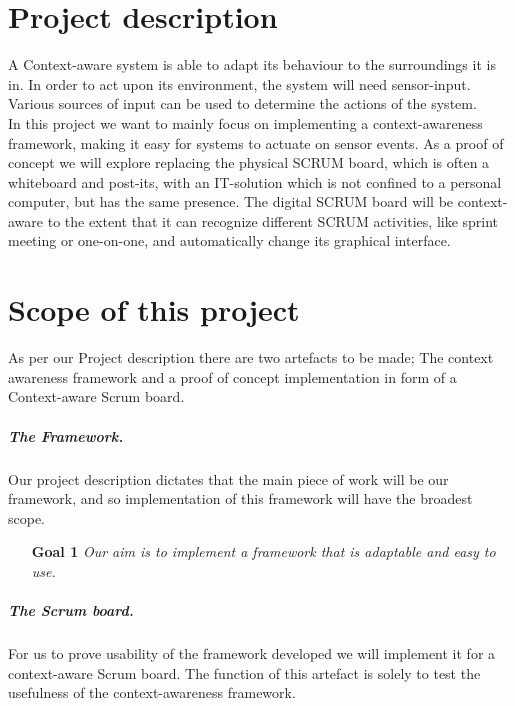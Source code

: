 \documentclass[]{report}
\begin{document}
\graphicspath{{img/}{../img/}}


\begin{abstract}
\end{abstract}


\chapter{Project description}
A Context-aware system is able to adapt its behaviour to the surroundings it is in. In order to act upon its environment, the system will need sensor-input. Various sources of input can be used to determine the actions of the system.\\

In this project we want to mainly focus on implementing a context-awareness framework, making it easy for systems to actuate on sensor events. As a proof of concept we will explore replacing the physical SCRUM board, which is often a whiteboard and post-its, with an IT-solution which is not confined to a personal computer, but has the same presence. The digital SCRUM board will be context-aware to the extent that it can recognize different SCRUM activities, like sprint meeting or one-on-one, and automatically change its graphical interface.


\chapter{Scope of this project}

As per our Project description there are two artefacts to be made; The context awareness framework and a proof of concept implementation in form of a Context-aware Scrum board.

\paragraph{The Framework.} 
Our project description dictates that the main piece of work will be our framework, and so implementation of this framework will have the broadest scope.\\

\begin{itemize}
\item[\textbf{Goal 1 }] \textit{Our aim is to implement a framework that is adaptable and easy to use.}
\end{itemize}


\paragraph{The Scrum board.} 
For us to prove usability of the framework developed we will implement it for a context-aware Scrum board. The function of this artefact is solely to test the usefulness of the context-awareness framework.\\
\end{document}
